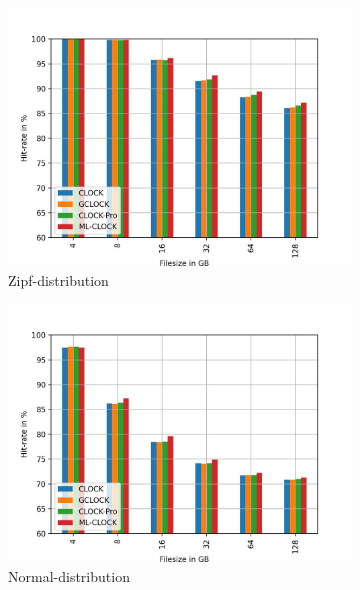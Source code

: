 \documentclass[
	12pt,
	a4paper,
	abstract,
	bibliography=totoc,
	chapterprefix,
	headings=openright,
	numbers=endperiod,
	parskip=half,
	twoside,
]{scrreprt}
\begin{document}
\begin{figure}
	\centering
	\begin{subfigure}{0.4\textwidth}
		\includegraphics[width=\textwidth]{rw_50to50_zipf.jpg}		
		\caption{Zipf-distribution}
		\label{fig:rw_90to10  zipf}
	\end{subfigure}
	\hfill
	\begin{subfigure}{0.4\textwidth}
		\includegraphics[width=\textwidth]{rw_50to50_normal.jpg}		
		\caption{Normal-distribution}
		\label{fig:rw_90to10  normal}
	\end{subfigure}
	\hfill
	\begin{subfigure}{0.4\textwidth}

\end{subfigure}
\end{figure}
\end{document}
